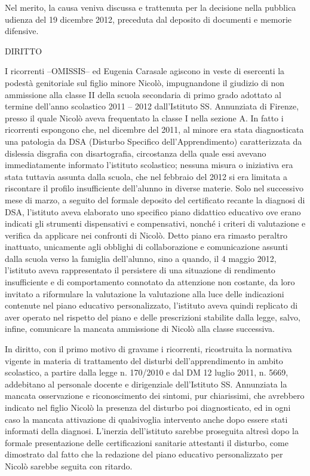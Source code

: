 Nel merito, la causa veniva discussa e trattenuta per la decisione nella pubblica udienza del 19 dicembre 2012, preceduta dal deposito di documenti e memorie difensive.
\begin{center}
	DIRITTO
\end{center}
I ricorrenti --OMISSIS-- ed Eugenia Carasale agiscono in veste di esercenti la podestà genitoriale sul figlio minore Nicolò, impugnandone il giudizio di non ammissione alla classe II della scuola secondaria di primo grado adottato al termine dell'anno scolastico 2011 -- 2012 dall'Istituto SS. Annunziata di Firenze, presso il quale Nicolò aveva frequentato la classe I nella sezione A. In fatto i ricorrenti espongono che, nel dicembre del 2011, al minore era stata diagnosticata una patologia da DSA (Disturbo Specifico dell'Apprendimento) caratterizzata da dislessia disgrafia con disartografia, circostanza della quale essi avevano immediatamente informato l'istituto scolastico; nessuna misura o iniziativa era stata tuttavia assunta dalla scuola, che nel febbraio del 2012 si era limitata a riscontare il profilo insufficiente dell'alunno in diverse materie. Solo nel successivo mese di marzo, a seguito del formale deposito del certificato recante la diagnosi di DSA, l'istituto aveva elaborato uno specifico piano didattico educativo ove erano indicati gli strumenti dispensativi e compensativi, nonché i criteri di valutazione e verifica da applicare nei confronti di Nicolò. Detto piano era rimasto peraltro inattuato, unicamente agli obblighi di collaborazione e comunicazione assunti dalla scuola verso la famiglia dell'alunno, sino a quando, il 4 maggio 2012, l'istituto aveva rappresentato il persistere di una situazione di rendimento insufficiente e di comportamento connotato da attenzione non costante, da loro invitato a riformulare la valutazione la valutazione alla luce delle indicazioni contenute nel piano educativo personalizzato, l'istituto aveva quindi replicato di aver operato nel rispetto del piano e delle prescrizioni stabilite dalla legge, salvo, infine, comunicare la mancata ammissione di Nicolò alla classe successiva.

In diritto, con il primo motivo di gravame i ricorrenti, ricostruita la normativa vigente in materia di trattamento del disturbi dell'apprendimento in ambito scolastico, a partire dalla legge n. 170/2010 e dal DM 12 luglio 2011, n. 5669, addebitano al personale docente e dirigenziale dell'Istituto SS. Annunziata la mancata osservazione e riconoscimento dei sintomi, pur chiarissimi, che avrebbero indicato nel figlio Nicolò la presenza del disturbo poi diagnosticato, ed in ogni caso la mancata attivazione di qualsivoglia intervento anche dopo essere stati informati della diagnosi. L'inerzia dell'istituto sarebbe proseguita altresì dopo la formale presentazione delle certificazioni sanitarie attestanti il disturbo, come dimostrato dal fatto che la redazione del piano educativo personalizzato per Nicolò sarebbe seguita con ritardo.

